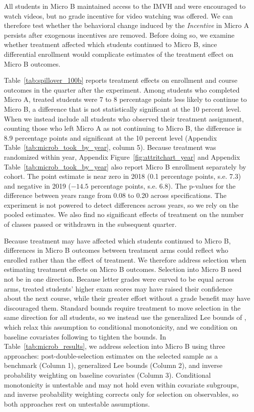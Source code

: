 All students in Micro B maintained access to the IMVH and were encouraged to watch videos, but no grade incentive for video watching was offered.
We can therefore test whether the behavioral change induced by the \textit{Incentive} in Micro A persists after exogenous incentives are removed.
Before doing so, we examine whether treatment affected which students continued to Micro B, since differential enrollment would complicate estimates of the treatment effect on Micro B outcomes.

Table~\ref{tab:spillover_100b} reports treatment effects on enrollment and course outcomes in the quarter after the experiment. 
Among students who completed Micro A, treated students were 7 to 8 percentage points less likely to continue to Micro B, a difference that is not statistically significant at the 10 percent level.
When we instead include all students who observed their treatment assignment, counting those who left Micro A as not continuing to Micro B, the difference is 8.9 percentage points and significant at the 10 percent level (Appendix Table~\ref{tab:microb_took_by_year}, column 5).
Because treatment was randomized within year, Appendix Figure~\ref{fig:attritchart_year} and Appendix Table~\ref{tab:microb_took_by_year} also report Micro B enrollment separately by cohort. 
The point estimate is near zero in 2018 (0.1 percentage points, s.e. 7.3) and negative in 2019 ($-14.5$ percentage points, s.e. 6.8). 
The p-values for the difference between years range from 0.08 to 0.20 across specifications. 
The experiment is not powered to detect differences across years, so we rely on the pooled estimates. 
We also find no significant effects of treatment on the number of classes passed or withdrawn in the subsequent quarter.



Because treatment may have affected which students continued to Micro B, differences in Micro B outcomes between treatment arms could reflect who enrolled rather than the effect of treatment.
We therefore address selection when estimating treatment effects on Micro B outcomes. 
Selection into Micro B need not be in one direction. 
Because letter grades were curved to be equal across arms, treated students' higher exam scores may have raised their confidence about the next course, while their greater effort without a grade benefit may have discouraged them. 
Standard \textcite{lee2009} bounds require treatment to move selection in the same direction for all students, so we instead use the generalized Lee bounds of \textcite{semenova2025}, which relax this assumption to conditional monotonicity, and we condition on baseline covariates following \textcite{heiler2024} to tighten the bounds.
In Table~\ref{tab:microb_results}, we address selection into Micro B using three approaches: post-double-selection estimates on the selected sample as a benchmark (Column 1), generalized Lee bounds (Column 2), and inverse probability weighting on baseline covariates (Column 3).
Conditional monotonicity is untestable and may not hold even within covariate subgroups, and inverse probability weighting corrects only for selection on observables, so both approaches rest on untestable assumptions.

